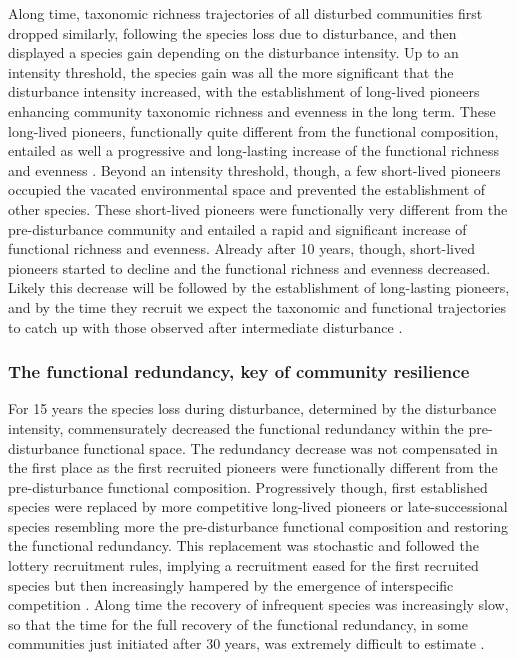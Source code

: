 \documentclass[
  11pt,
  french,
  A4paper,
  extrafontsizes,onecolumn,openright
  ]{memoir}
\begin{document}
Along time, taxonomic richness trajectories of all disturbed communities
first dropped similarly, following the species loss due to disturbance,
and then displayed a species gain depending on the disturbance
intensity. Up to an intensity threshold, the species gain was all the
more significant that the disturbance intensity increased, with the
establishment of long-lived pioneers enhancing community taxonomic
richness and evenness in the long term. These long-lived pioneers,
functionally quite different from the functional composition, entailed
as well a progressive and long-lasting increase of the functional
richness and evenness \autocites{Denslow1980}{Molino2001}. Beyond an
intensity threshold, though, a few short-lived pioneers occupied the
vacated environmental space and prevented the establishment of other
species. These short-lived pioneers were functionally very different
from the pre-disturbance community and entailed a rapid and significant
increase of functional richness and evenness. Already after 10 years,
though, short-lived pioneers started to decline and the functional
richness and evenness decreased. Likely this decrease will be followed
by the establishment of long-lasting pioneers, and by the time they
recruit we expect the taxonomic and functional trajectories to catch up
with those observed after intermediate disturbance
\autocite{Walker2009}.

\subsubsection{The functional redundancy, key of community
resilience}\label{the-functional-redundancy-key-of-community-resilience}

For 15 years the species loss during disturbance, determined by the
disturbance intensity, commensurately decreased the functional
redundancy within the pre-disturbance functional space. The redundancy
decrease was not compensated in the first place as the first recruited
pioneers were functionally different from the pre-disturbance functional
composition. Progressively though, first established species were
replaced by more competitive long-lived pioneers or late-successional
species resembling more the pre-disturbance functional composition and
restoring the functional redundancy. This replacement was stochastic and
followed the lottery recruitment rules, implying a recruitment eased for
the first recruited species but then increasingly hampered by the
emergence of interspecific competition \autocite{Busing2002}. Along time
the recovery of infrequent species was increasingly slow, so that the
time for the full recovery of the functional redundancy, in some
communities just initiated after 30 years, was extremely difficult to
estimate \autocites{Elmqvist2003}{Diaz2005}.
\end{document}
